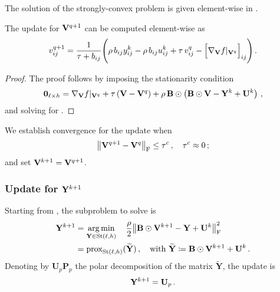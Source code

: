 The solution of the strongly-convex problem is given element-wise in . 
\begin{lemma}\label{lemma:updateV_elementwise_full}
    The update for $\mathbf{V}^{q+1}$ can be computed element-wise as
    \begin{equation}\label{updateV_elementwise_full}
        v_{ij}^{q+1}= \frac{1}{\tau + b_{ij}}\Bigg(\rho\, b_{ij} y_{ij}^k - \rho\, b_{ij} u_{ij}^k + \tau\, v_{ij}^q - \Big[\nabla_{\mathbf{V}} f|_{\mathbf{V}^q}\Big]_{ij} \Bigg)\,.
    \end{equation}
\end{lemma}
\begin{proof}
    The proof follows by imposing the stationarity condition
    \begin{equation}
        \mathbf{0}_{\ell\times h} = \nabla_{\mathbf{V}} f|_{\mathbf{V}^q} + \tau \left(\mathbf{V}-\mathbf{V}^q\right) + \rho \, \mathbf{B} \odot \left( \mathbf{B} \odot \mathbf{V} - \mathbf{Y}^k +\mathbf{U}^k\right)\,,
    \end{equation}
    and solving for \V.
\end{proof}

We establish convergence for the update when
\begin{equation}\label{eq:convergenceV_full}
    \norm{\mathbf{V}^{q+1}-\mathbf{V}^q}_{\mathrm{F}}\leq \tau^c\,, \quad \tau^c \approx 0\,;
\end{equation}
and set $\mathbf{V}^{k+1}=\mathbf{V}^{q+1}$.

\subsubsection{\texorpdfstring{Update for $\mathbf{Y}^{k+1}$}{Update for Y}}
Starting from , the subproblem to solve is
\begin{equation}\label{eq:updateY_full}
    \begin{aligned}
        \mathbf{Y}^{k+1}&=\operatorname*{arg\,min}_{\mathbf{Y} \in \mathrm{St}({\ell},{h})}\quad \frac{\rho}{2}\norm{\mathbf{B} \odot \mathbf{V}^{k+1} - \mathbf{Y} +\mathbf{U}^k}_{\mathrm{F}}^2\\
                &=\mathrm{prox}_{\mathrm{St}({\ell},{h})}(\widetilde{\mathbf{Y}})\,, \quad \text{with } \widetilde{\mathbf{Y}}\coloneqq\mathbf{B} \odot \mathbf{V}^{k+1} +\mathbf{U}^k\,.
    \end{aligned}            
\end{equation}
Denoting by $\mathbf{U}_p \mathbf{P}_p$ the polar decomposition of the matrix $\widetilde{\mathbf{Y}}$, the update is
\begin{equation}\label{eq:updateY_solution}
    \mathbf{Y}^{k+1}=\mathbf{U}_p\,.
\end{equation}

